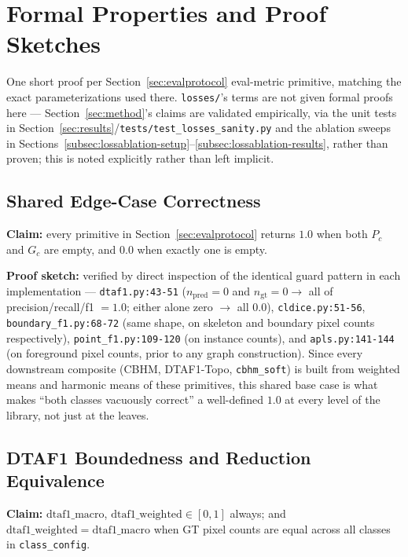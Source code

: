 \section{Formal Properties and Proof Sketches}
\label{app:proofs}

One short proof per Section~\ref{sec:evalprotocol} eval-metric primitive, matching the exact
parameterizations used there. \texttt{losses/}'s terms are not given formal proofs here ---
Section~\ref{sec:method}'s claims are validated empirically, via the unit tests in
Section~\ref{sec:results}/\texttt{tests/test\_losses\_sanity.py} and the ablation sweeps in
Sections~\ref{subsec:lossablation-setup}--\ref{subsec:lossablation-results}, rather than proven;
this is noted explicitly rather than left implicit.

\subsection{Shared Edge-Case Correctness}
\label{app:a1}

\textbf{Claim:} every primitive in Section~\ref{sec:evalprotocol} returns $1.0$ when both $P_c$
and $G_c$ are empty, and $0.0$ when exactly one is empty.

\textbf{Proof sketch:} verified by direct inspection of the identical guard pattern in each
implementation --- \texttt{dtaf1.py:43-51} ($n_{\mathrm{pred}}=0$ and $n_{\mathrm{gt}}=0 \to$ all
of precision/recall/f1 $=1.0$; either alone zero $\to$ all $0.0$), \texttt{cldice.py:51-56},
\texttt{boundary\_f1.py:68-72} (same shape, on skeleton and boundary pixel counts respectively),
\texttt{point\_f1.py:109-120} (on instance counts), and \texttt{apls.py:141-144} (on foreground
pixel counts, prior to any graph construction). Since every downstream composite (CBHM,
DTAF1-Topo, \texttt{cbhm\_soft}) is built from weighted means and harmonic means of these
primitives, this shared base case is what makes ``both classes vacuously correct'' a well-defined
$1.0$ at every level of the library, not just at the leaves.

\subsection{DTAF1 Boundedness and Reduction Equivalence}
\label{app:a2}

\textbf{Claim:} $\mathrm{dtaf1\_macro}$, $\mathrm{dtaf1\_weighted} \in [0,1]$ always; and
$\mathrm{dtaf1\_weighted} = \mathrm{dtaf1\_macro}$ when GT pixel counts are equal across all
classes in \texttt{class\_config}.

